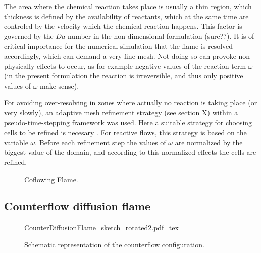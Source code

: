 The area where the chemical reaction takes place is usually a thin region, which thickness is defined by the availability of reactants, which at the same time are controled by the velocity which the chemical reaction happens. This factor is governed by the $Da$ number in the non-dimensional formulation (sure??). It is of critical importance for the numerical simulation that the flame is resolved accordingly, which can demand a very fine mesh. Not doing so can provoke non-physically effects to occur, as for example negative values of the reaction term $\omega$ (in the present formulation the reaction is irreversible, and thus only positive values of $\omega$ make sense). 

For avoiding over-resolving in zones where actually no reaction is taking place (or very slowly), an adaptive mesh refinement strategy  (see section X) within a pseudo-time-stepping framework was used.  Here a  suitable strategy for choosing cells to be refined is necesary . For reactive flows, this strategy is based on the variable $\omega$.
Before each refinement step the values of $\omega$ are normalized by the biggest value of the domain, and according to this normalized effects the cells are refined. %


\begin{figure}
	\centering
	\pgfplotsset{width=0.75 \textwidth, compat=1.3}
	\caption{Coflowing Flame.} \label{fig:CoFlowFlameFig}
\end{figure}
\subsection{Counterflow diffusion flame}\label{ss:CDF}	

\begin{figure}[b]
	\begin{center}
		\def\svgwidth{0.8\textwidth}
		{CounterDiffusionFlame_sketch_rotated2.pdf_tex}		
\caption{Schematic representation of the counterflow configuration.}
\label{fig:CDFScheme}
	\end{center}	
\end{figure} 

